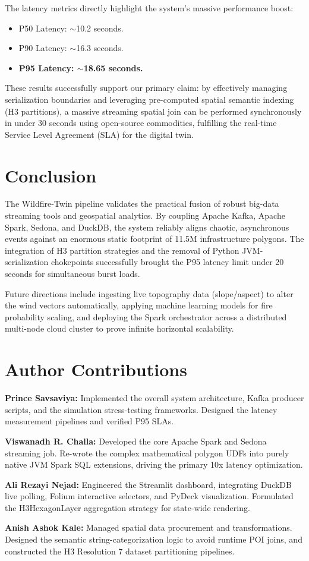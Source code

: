 \documentclass[acmsmall,screen,nonacm]{acmart}
\begin{document}
The latency metrics directly highlight the system's massive performance boost:
\begin{itemize}
    \item P50 Latency: $\sim$10.2 seconds.
    \item P90 Latency: $\sim$16.3 seconds.
    \item \textbf{P95 Latency: $\sim$18.65 seconds.}
\end{itemize}

These results successfully support our primary claim: by effectively managing serialization boundaries and leveraging pre-computed spatial semantic indexing (H3 partitions), a massive streaming spatial join can be performed synchronously in under 30 seconds using open-source commodities, fulfilling the real-time Service Level Agreement (SLA) for the digital twin.

\section{Conclusion}
The Wildfire-Twin pipeline validates the practical fusion of robust big-data streaming tools and geospatial analytics. By coupling Apache Kafka, Apache Spark, Sedona, and DuckDB, the system reliably aligns chaotic, asynchronous events against an enormous static footprint of 11.5M infrastructure polygons. The integration of H3 partition strategies and the removal of Python JVM-serialization chokepoints successfully brought the P95 latency limit under 20 seconds for simultaneous burst loads.

Future directions include ingesting live topography data (slope/aspect) to alter the wind vectors automatically, applying machine learning models for fire probability scaling, and deploying the Spark orchestrator across a distributed multi-node cloud cluster to prove infinite horizontal scalability.

\section*{Author Contributions}
\textbf{Prince Savsaviya:} Implemented the overall system architecture, Kafka producer scripts, and the simulation stress-testing frameworks. Designed the latency measurement pipelines and verified P95 SLAs.

\textbf{Viswanadh R. Challa:} Developed the core Apache Spark and Sedona streaming job. Re-wrote the complex mathematical polygon UDFs into purely native JVM Spark SQL extensions, driving the primary 10x latency optimization.

\textbf{Ali Rezayi Nejad:} Engineered the Streamlit dashboard, integrating DuckDB live polling, Folium interactive selectors, and PyDeck visualization. Formulated the H3HexagonLayer aggregation strategy for state-wide rendering.

\textbf{Anish Ashok Kale:} Managed spatial data procurement and transformations. Designed the semantic string-categorization logic to avoid runtime POI joins, and constructed the H3 Resolution 7 dataset partitioning pipelines.



\end{document}
